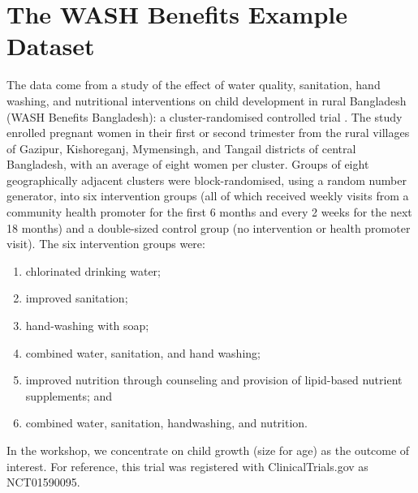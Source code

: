 \documentclass[
  12pt, krantz2,
]{book}
\providecommand{\tightlist}{%
  \setlength{\itemsep}{0pt}\setlength{\parskip}{0pt}}
\theoremstyle{definition}
\theoremstyle{definition}
\theoremstyle{definition}
\newcommand{\1}{\mathbbm{1}}
\begin{document}
\hypertarget{the-wash-benefits-example-dataset}{%
\section{The WASH Benefits Example Dataset}\label{the-wash-benefits-example-dataset}}

The data come from a study of the effect of water quality, sanitation, hand
washing, and nutritional interventions on child development in rural Bangladesh
(WASH Benefits Bangladesh): a cluster-randomised controlled trial
\citep{luby2018effects}. The study enrolled pregnant women in their first or second
trimester from the rural villages of Gazipur, Kishoreganj, Mymensingh, and
Tangail districts of central Bangladesh, with an average of eight women per
cluster. Groups of eight geographically adjacent clusters were block-randomised,
using a random number generator, into six intervention groups (all of which
received weekly visits from a community health promoter for the first 6 months
and every 2 weeks for the next 18 months) and a double-sized control group (no
intervention or health promoter visit). The six intervention groups were:

\begin{enumerate}
\def\labelenumi{\arabic{enumi}.}
\tightlist
\item
  chlorinated drinking water;
\item
  improved sanitation;
\item
  hand-washing with soap;
\item
  combined water, sanitation, and hand washing;
\item
  improved nutrition through counseling and provision of lipid-based nutrient
  supplements; and
\item
  combined water, sanitation, handwashing, and nutrition.
\end{enumerate}

In the workshop, we concentrate on child growth (size for age) as the outcome of
interest. For reference, this trial was registered with ClinicalTrials.gov as
NCT01590095.
\end{document}

